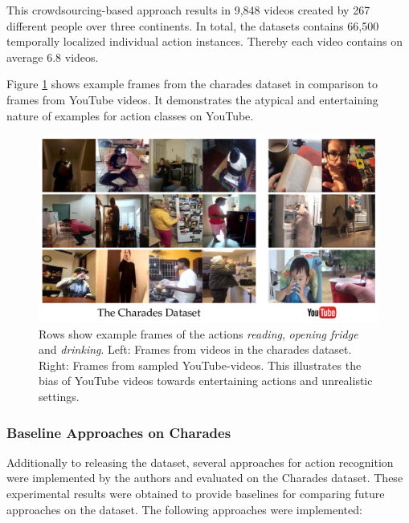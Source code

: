 This crowdsourcing-based approach results in 9,848 videos created by 267 different people over three continents.
In total, the datasets contains 66,500 temporally localized individual action instances.
Thereby each video contains on average 6.8 videos.

Figure \ref{fig:charades_vs_youtube} shows example frames from the charades dataset in comparison to frames from YouTube videos.
It demonstrates the atypical and entertaining nature of examples for action classes on YouTube.

\begin{figure}[H]
    \centering
    \includegraphics[width=\textwidth]{img_datasets/charades_vs_youtube}
    \caption{Rows show example frames of the actions \textit{reading}, \textit{opening fridge} and \textit{drinking}. Left: Frames from videos in the charades dataset. Right: Frames from sampled YouTube-videos. This illustrates the bias of YouTube videos towards entertaining actions and unrealistic settings. \cite{sigurdsson_hollywood_2016}}
    \label{fig:charades_vs_youtube}
\end{figure}

\subsubsection{Baseline Approaches on Charades}

Additionally to releasing the dataset, several approaches for action recognition were implemented by the authors and evaluated on the Charades dataset.
These experimental results were obtained to provide baselines for comparing future approaches on the dataset.
The following approaches were implemented:


